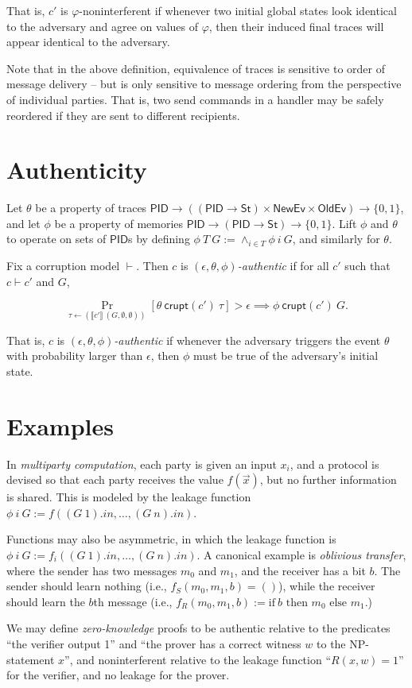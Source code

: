 \documentclass{article}
\newcommand{\St}{\mathsf{St}}
\newcommand{\PID}{\mathsf{PID}}
\newcommand{\NewEv}{\mathsf{NewEv}}
\newcommand{\OldEv}{\mathsf{OldEv}}
\begin{document}
That is, $c'$ is $\varphi$-noninterferent  if whenever two initial global states look identical to the adversary and agree on values of $\varphi$, then their induced final traces will appear identical to the adversary. 

Note that in the above definition, equivalence of traces is sensitive to order of message delivery -- but is only sensitive to message ordering from the perspective of individual parties. That is, two send commands in a handler may be safely reordered if they are sent to different recipients.


\section{Authenticity}

Let $\theta$ be a property of traces $\PID \to ((\PID \to \St) \times \NewEv \times \OldEv) \to \{0,1\}$, and let $\phi$ be a property of memories $\PID \to (\PID \to \St) \to \{0,1\}$. Lift $\phi$ and $\theta$ to operate on sets of $\PID$s by defining $\phi\ T\ G := \wedge_{i \in T} \phi\ i\ G$, and similarly for $\theta$.

Fix a corruption model $\vdash$. Then $c$ is \emph{$(\epsilon, \theta, \phi)$-authentic} if for all $c'$ such that $c \vdash c'$ and $G$,

\[ \Pr_{\tau \leftarrow (\llbracket c' \rrbracket\ (G, \emptyset, \emptyset))}[\theta\ \mathsf{crupt}(c')\ \tau] > \epsilon \implies \phi\ \mathsf{crupt}(c')\ G.\]

That is, $c$ is \emph{$(\epsilon, \theta, \phi)$-authentic} if whenever the adversary triggers the event $\theta$ with probability larger than $\epsilon$, then $\phi$ must be true of the adversary's initial state.


\section{Examples}


In \emph{multiparty computation}, each party is given an input $x_i$, and a protocol is devised so that each party receives the value $f(\vec{x})$, but no further information is shared. This is modeled by the leakage function $\phi\ i\ G := f((G\ 1).in, \dots, (G\ n).in)$.

Functions may also be asymmetric, in which the leakage function is $\phi\ i\ G := f_i((G\ 1).in, \dots, (G\ n).in)$. A canonical example is \emph{oblivious transfer}, where the sender has two messages $m_0$ and $m_1$, and the receiver has a bit $b$. The sender should learn nothing (i.e., $f_S (m_0, m_1, b) = ()$), while the receiver should learn the $b$th message (i.e., $f_R (m_0, m_1, b) := \text{if}\ b \text{ then } m_0 \text{ else } m_1.$)


We may define \emph{zero-knowledge} proofs to be authentic relative to the predicates ``the verifier output 1'' and ``the prover has a correct witness $w$ to the NP-statement $x$'', and noninterferent relative to the leakage function ``$R(x,w) = 1$'' for the verifier, and no leakage for the prover. 
\end{document}
